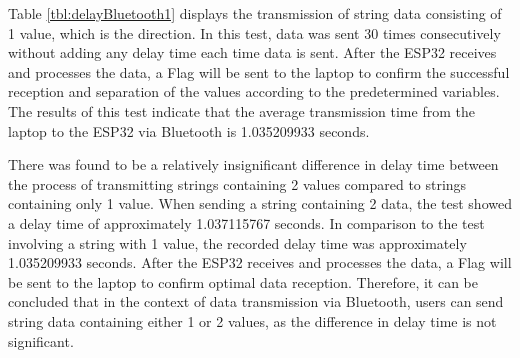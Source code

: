 Table \ref{tbl:delayBluetooth1} displays the transmission of string data consisting of 1 value, which is the direction. In this test, data was sent 30 times consecutively without adding any delay time each time data is sent. After the ESP32 receives and processes the data, a Flag will be sent to the laptop to confirm the successful reception and separation of the values according to the predetermined variables. The results of this test indicate that the average transmission time from the laptop to the ESP32 via Bluetooth is 1.035209933 seconds.

There was found to be a relatively insignificant difference in delay time between the process of transmitting strings containing 2 values compared to strings containing only 1 value. When sending a string containing 2 data, the test showed a delay time of approximately 1.037115767 seconds. In comparison to the test involving a string with 1 value, the recorded delay time was approximately 1.035209933 seconds. After the ESP32 receives and processes the data, a Flag will be sent to the laptop to confirm optimal data reception. Therefore, it can be concluded that in the context of data transmission via Bluetooth, users can send string data containing either 1 or 2 values, as the difference in delay time is not significant.

